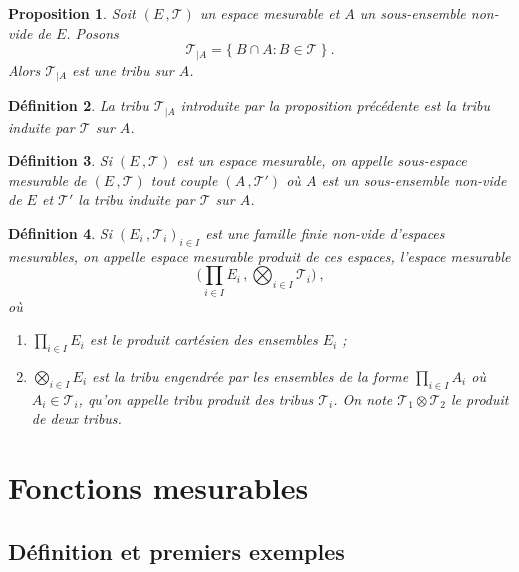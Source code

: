 \documentclass{scrreport}
\theoremstyle{def}
\newtheorem{definition}{Définition}
\theoremstyle{thm}
\theoremstyle{prop}
\newtheorem{proposition}[definition]{Proposition}
\theoremstyle{rem}
\numberwithin{definition}{section}
\numberwithin{lemma}{section}
\numberwithin{proposition}{section}
\numberwithin{theorem}{section}
\numberwithin{corol}{section}
\numberwithin{notation}{section}
\numberwithin{example}{section}
\numberwithin{exercise}{section}
\numberwithin{remark}{section}
\newcommand{\scrT}{\mathscr{T}}
\newcommand{\p}{\:\!}
\begin{document}
\begin{proposition}\label{prop1:4:2}
	Soit \((E\,, \scrT)\) un espace mesurable et \(A\) un sous-ensemble non-vide de \(E\). Posons
	\[ \scrT_{|A} = \{\p B \cap A \mathrel{:} B \in \scrT \p\} \: \text{.} \]
	Alors \(\scrT_{|A}\) est une tribu sur \(A\).
\end{proposition}

\begin{definition}\label{def1:4:3}
	La tribu \(\scrT_{|A}\) introduite par la proposition précédente est la tribu induite par \(\scrT\) sur \(A\).
\end{definition}

\begin{definition}\label{def1:4:4}
	Si \((E\,, \scrT)\) est un espace mesurable, on appelle sous-espace mesurable de \((E\,, \scrT)\) tout couple \((A\,, \scrT')\) où \(A\) est un sous-ensemble non-vide de \(E\) et \(\scrT'\) la tribu induite par \(\scrT\) sur \(A\).
\end{definition}

\begin{definition}
	Si \({(E_i\,, \scrT_i)}_{i \in I}\) est une famille finie non-vide d'espaces mesurables, on appelle espace mesurable produit de ces espaces, l'espace mesurable
	\[ \Biggl( \prod_{i \in I} E_i \,, \bigotimes_{i \in I} \scrT_i \Biggr) \: \text{,} \]
	où
	\begin{enumerate}\label{def1:4:5}
		\item \(\prod_{i \in I} E_i\) est le produit cartésien des ensembles \(E_i\) ;
		\item \(\bigotimes_{i \in I} E_i\) est la tribu engendrée par les ensembles de la forme \(\prod_{i \in I} A_i\) où \(A_i \in \scrT_i\), qu'on appelle tribu produit des tribus \(\scrT_i\). On note \(\scrT_1 \otimes \scrT_2\) le produit de deux tribus.
	\end{enumerate}
\end{definition}

\section{Fonctions mesurables}

\subsection{Définition et premiers exemples}
\end{document}
